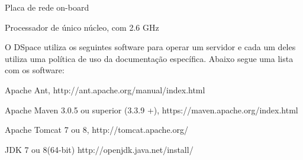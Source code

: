 \documentclass[12pt,hidelinks]{article}
\begin{document}
    \textbullet \hspace{6pt} Placa de rede on-board
 
    \textbullet \hspace{6pt} Processador de único núcleo, com 2.6 GHz

    \singlespacing  O DSpace utiliza os seguintes software para operar um servidor e cada um deles utiliza uma política de uso da documentação específica. Abaixo segue uma lista com os software: 
 
    \singlespacing \textbullet \hspace{6pt} Apache Ant, http://ant.apache.org/manual/index.html
  
    \textbullet \hspace{6pt} Apache Maven 3.0.5 ou superior (3.3.9 +), https://maven.apache.org/index.html
  
    \textbullet \hspace{6pt} Apache Tomcat 7 ou 8, http://tomcat.apache.org/
 
    \textbullet \hspace{6pt} JDK 7 ou 8(64-bit) http://openjdk.java.net/install/

\newpage
\end{document}
